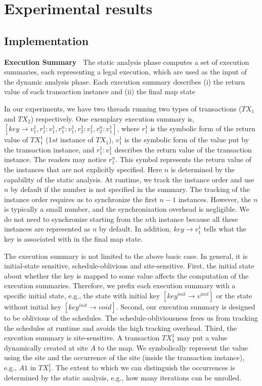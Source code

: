\section{Experimental results}
\subsection{Implementation}

{\bf Execution Summary\ } The static analysis phase computes a set of execution summaries, each representing a legal execution, which are used as the input of the dynamic analysis phase.
Each execution summary describes (i) the return value of each transaction instance and (ii) the final map state
 

In our experiments,  we have two threads running two types of transactions ($TX_1$ and $TX_2$) respectively. One exemplary execution summary is, $[key\rightarrow v^1_1, r^1_1:v^1_1, r^n_1:v^1_1, r^1_2:v^1_1, r^n_2:v^1_1]$, where $r^1_1$ is the symbolic form of the return value of $TX^1_1$ (1$st$ instance of $TX_1$), $v^1_1$ is the symbolic form of the value put by the transaction instance, and $r^1_1:v^1_1$ describes the return value of the transaction instance. The readers may notice $r^n_1$. This symbol represents the return value of the instances that are not explicitly specified.  Here $n$ is determined by the capability of the static analysis. At runtime, we track the instance order and use $n$ by default if the number is not specified in the summary. The tracking of the instance order requires us to synchronize the first $n-1$ instances. However, the $n$ is typically a small number, and the synchronization overhead is negligible. We do not need to synchronize starting from the $n$th instance because all these instances are represented as $n$ by default. In addition, $key\rightarrow v^1_1$ tells what the key is associated with in the final map state. 

The execution summary is not limited to the above basic case. In general, it is initial-state sensitive, schedule-oblivious and site-sensitive. 
First, the initial state about whether the key is mapped to some value affects the computation of the execution summaries. Therefore, we prefix each execution summary with a specific initial state, e.g., the state with initial key $[key^{init}\rightarrow v^{init}]$ or the state without initial key $[key^{init}\rightarrow void]$.
Second, our execution summary is designed to be oblivious of the schedules. The schedule-obliviousness frees us from tracking the schedules at runtime and avoids the high tracking overhead. Third, the execution summary is site-sensitive. A transaction $TX^1_1$ may put a value dynamically created at site $A$ to the map. We symbolically represent the value using the site and the occurrence of the site (inside the transaction instance), e.g., $A1$ in $TX^1_1$. The extent to which we can distinguish the occurrences is determined by the static analysis, e.g., how many iterations can be unrolled.


